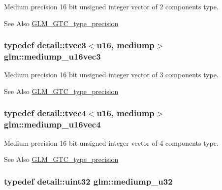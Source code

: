 Medium precision 16 bit unsigned integer vector of 2 components type. \begin{DoxySeeAlso}{See Also}
\hyperlink{group__gtc__type__precision}{G\-L\-M\-\_\-\-G\-T\-C\-\_\-type\-\_\-precision} 
\end{DoxySeeAlso}
\hypertarget{group__gtc__type__precision_ga82dbfd263ced8d03577008a3ef096598}{
\subsubsection[{mediump\-\_\-u16vec3}]{\setlength{\rightskip}{0pt plus 5cm}typedef detail\-::tvec3$<$u16, mediump$>$ {\bf glm\-::mediump\-\_\-u16vec3}}}\label{group__gtc__type__precision_ga82dbfd263ced8d03577008a3ef096598}
Medium precision 16 bit unsigned integer vector of 3 components type. \begin{DoxySeeAlso}{See Also}
\hyperlink{group__gtc__type__precision}{G\-L\-M\-\_\-\-G\-T\-C\-\_\-type\-\_\-precision} 
\end{DoxySeeAlso}
\hypertarget{group__gtc__type__precision_gaad8b540f4231f69823c39fe9dfcb945a}{
\subsubsection[{mediump\-\_\-u16vec4}]{\setlength{\rightskip}{0pt plus 5cm}typedef detail\-::tvec4$<$u16, mediump$>$ {\bf glm\-::mediump\-\_\-u16vec4}}}\label{group__gtc__type__precision_gaad8b540f4231f69823c39fe9dfcb945a}
Medium precision 16 bit unsigned integer vector of 4 components type. \begin{DoxySeeAlso}{See Also}
\hyperlink{group__gtc__type__precision}{G\-L\-M\-\_\-\-G\-T\-C\-\_\-type\-\_\-precision} 
\end{DoxySeeAlso}
\hypertarget{group__gtc__type__precision_gad0c27a525045c299a92306eb4cd7c13a}{
\subsubsection[{mediump\-\_\-u32}]{\setlength{\rightskip}{0pt plus 5cm}typedef detail\-::uint32 {\bf glm\-::mediump\-\_\-u32}}}\label{group__gtc__type__precision_gad0c27a525045c299a92306eb4cd7c13a}
